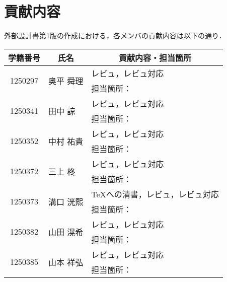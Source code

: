 \chapter{貢献内容}
外部設計書第1版の作成における，各メンバの貢献内容は以下の通り．
\begin{table}[h]
    \centering
    \begin{tabularx}{\textwidth}{cll}
        \multicolumn{1}{c}{学籍番号} & \multicolumn{1}{c}{氏名} & \multicolumn{1}{c}{貢献内容・担当箇所} \\
        \hline
        \multirow{2}{*}{1250297} & \multirow{2}{*}{奥平 舜理} & レビュ，レビュ対応                     \\
                                 &                        & 担当箇所：                         \\
        \hline
        \multirow{2}{*}{1250341} & \multirow{2}{*}{田中 諒}  & レビュ，レビュ対応                     \\
                                 &                        & 担当箇所：                         \\
        \hline
        \multirow{2}{*}{1250352} & \multirow{2}{*}{中村 祐貴} & レビュ，レビュ対応                     \\
                                 &                        & 担当箇所：                         \\
        \hline
        \multirow{2}{*}{1250372} & \multirow{2}{*}{三上 柊}  & レビュ，レビュ対応                     \\
                                 &                        & 担当箇所：                         \\
        \hline
        \multirow{2}{*}{1250373} & \multirow{2}{*}{溝口 洸熙} & \TeX への清書，レビュ，レビュ対応           \\
                                 &                        & 担当箇所：                         \\
        \hline
        \multirow{2}{*}{1250382} & \multirow{2}{*}{山田 滉希} & レビュ，レビュ対応                     \\
                                 &                        & 担当箇所：                         \\
        \hline
        \multirow{2}{*}{1250385} & \multirow{2}{*}{山本 祥弘} & レビュ，レビュ対応                     \\
                                 &                        & 担当箇所：                         \\
        \hline
    \end{tabularx}
\end{table}